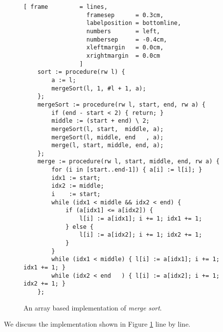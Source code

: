 \begin{figure}[!ht]
  \centering
\begin{Verbatim}[ frame         = lines, 
                  framesep      = 0.3cm, 
                  labelposition = bottomline,
                  numbers       = left,
                  numbersep     = -0.4cm,
                  xleftmargin   = 0.0cm,
                  xrightmargin  = 0.0cm
                ]
    sort := procedure(rw l) {
        a := l;
        mergeSort(l, 1, #l + 1, a); 
    };
    mergeSort := procedure(rw l, start, end, rw a) {
        if (end - start < 2) { return; }
        middle := (start + end) \ 2;
        mergeSort(l, start,  middle, a);  
        mergeSort(l, middle, end   , a);    
        merge(l, start, middle, end, a); 
    };
    merge := procedure(rw l, start, middle, end, rw a) {    
        for (i in [start..end-1]) { a[i] := l[i]; }
        idx1 := start;
        idx2 := middle;
        i    := start;
        while (idx1 < middle && idx2 < end) {
            if (a[idx1] <= a[idx2]) {
                l[i] := a[idx1]; i += 1; idx1 += 1;
            } else {
                l[i] := a[idx2]; i += 1; idx2 += 1;
            }
        }
        while (idx1 < middle) { l[i] := a[idx1]; i += 1; idx1 += 1; }
        while (idx2 < end   ) { l[i] := a[idx2]; i += 1; idx2 += 1; }
    };
\end{Verbatim}
\vspace*{-0.3cm}
  \caption{An array based implementation of \emph{merge sort}.}
  \label{fig:merge-sort-array.stlx}
\end{figure}
We discuss the implementation shown in Figure \ref{fig:merge-sort-array.stlx} line by line.
